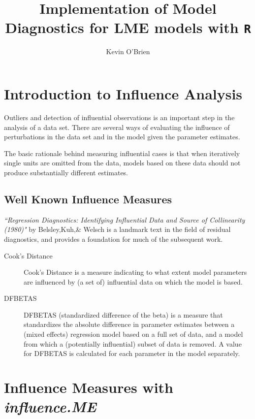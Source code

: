 \documentclass[12pt, a4paper]{article}
\begin{document}
\author{Kevin O'Brien}
\title{Implementation of Model Diagnostics for LME models with \texttt{R}}

\tableofcontents


\section{Introduction to Influence Analysis}

Outliers and detection of influential observations is an important step in the analysis of a data set. There are several ways of evaluating the influence of perturbations in the data set and in the model given the parameter estimates. 

The basic rationale behind measuring influential cases is that when iteratively single units are omitted
from the data, models based on these data should not produce substantially different estimates.
\subsection{Well Known Influence Measures}

\textit{``Regression Diagnostics: Identifying Influential Data
and Source of Collinearity (1980)"} by Belsley,Kuh,\& Welsch is a landmark text in the field of residual diagnostics, and
provides a foundation for much of the subsequent work.

\begin{description}
\item[Cook's Distance] Cook’s Distance is a measure indicating to what extent model parameters are influenced by (a set
of) influential data on which the model is based.
\item[DFBETAS] DFBETAS (standardized difference of the beta) is a measure that standardizes the absolute difference
in parameter estimates between a (mixed effects) regression model based on a full set of
data, and a model from which a (potentially influential) subset of data is removed. A value for
DFBETAS is calculated for each parameter in the model separately.
\end{description}


\newpage
\section{Influence Measures with \textit{influence.ME}}
\end{document}
